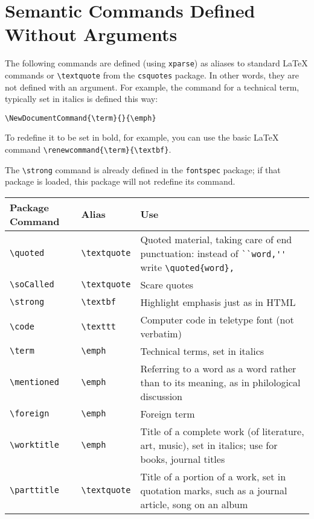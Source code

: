 \documentclass{article}
\begin{document}
\section{Semantic Commands Defined Without Arguments}

The following commands are defined (using \texttt{xparse}) as aliases to standard \LaTeX{} commands or \verb|\textquote| from the \texttt{csquotes} package.
In other words, they are not defined with an argument.
For example, the command for a technical term, typically set in italics is defined this way: 
\begin{verbatim}
\NewDocumentCommand{\term}{}{\emph}
\end{verbatim}
To redefine it to be set in bold, for example, you can use the basic \LaTeX{} command \verb|\renewcommand{\term}{\textbf}|.

The \verb|\strong| command is already defined in the \texttt{fontspec} package;
if that package is loaded, this package will not redefine its command.

\begin{center}
\begin{tabularx}{\linewidth}{llX}
\toprule
Package Command & Alias & Use\\
\midrule
\verb|\quoted| & \verb|\textquote| & Quoted material, taking care of end punctuation: instead of \verb|``word,''| write \verb|\quoted{word},|\\
\verb|\soCalled| & \verb|\textquote| & Scare quotes\\
\verb|\strong| & \verb|\textbf| & Highlight emphasis just as in HTML\\
\verb|\code| & \verb|\texttt| & Computer code in teletype font (not verbatim)\\
\verb|\term| & \verb|\emph| & Technical terms, set in italics\\
\verb|\mentioned| & \verb|\emph| & Referring to a word as a word rather than to its meaning, as in philological discussion\\
\verb|\foreign| & \verb|\emph| & Foreign term\\
\verb|\worktitle| & \verb|\emph| & Title of a complete work (of literature, art, music), set in italics; use for books, journal titles\\
\verb|\parttitle| & \verb|\textquote| & Title of a portion of a work, set in quotation marks, such as a journal article, song on an album\\
\bottomrule
\end{tabularx}
\end{center}
\end{document}
